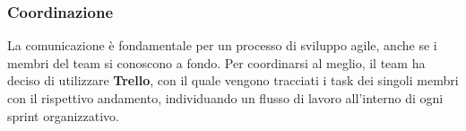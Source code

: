 \subsubsection{Coordinazione}
La comunicazione è fondamentale per un processo di sviluppo agile, anche se i membri del team si conoscono a fondo. Per coordinarsi al meglio, il team ha deciso di utilizzare \textbf{Trello}, con il quale vengono tracciati i task dei singoli membri con il rispettivo andamento, individuando un flusso di lavoro all'interno di ogni sprint organizzativo.